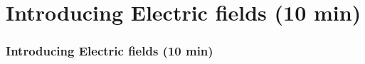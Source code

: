 \documentclass{beamer}
\begin{document}
\begin{frame}
%
\end{frame}



\section{Introducing Electric fields (10 min)}

\begin{frame}
\frametitle{Introducing Electric fields (10 min)}
\tableofcontents[currentsection]
\end{frame}
\end{document}
